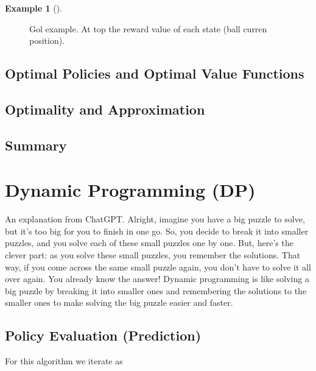 \documentclass[
  letterpaper,
]{krantz}
\theoremstyle{plain}
\theoremstyle{definition}
\newtheorem{example}{Example}[chapter]
\theoremstyle{definition}
\theoremstyle{remark}
\begin{document}
\begin{example}[]
\begin{figure}
\caption{\label{fig-golf-exm}Gol example. At top the reward value of
each state (ball curren position).}

\end{figure}%

\section{Optimal Policies and Optimal Value
Functions}\label{optimal-policies-and-optimal-value-functions}

\section{Optimality and
Approximation}\label{optimality-and-approximation}

\section{Summary}\label{summary-2}

\end{example}


\chapter{Dynamic Programming (DP)}\label{dynamic-programming-dp}

An explanation from ChatGPT. Alright, imagine you have a big puzzle to
solve, but it's too big for you to finish in one go. So, you decide to
break it into smaller puzzles, and you solve each of these small puzzles
one by one. But, here's the clever part: as you solve these small
puzzles, you remember the solutions. That way, if you come across the
same small puzzle again, you don't have to solve it all over again. You
already know the answer! Dynamic programming is like solving a big
puzzle by breaking it into smaller ones and remembering the solutions to
the smaller ones to make solving the big puzzle easier and faster.

\section{Policy Evaluation
(Prediction)}\label{policy-evaluation-prediction}

For this algorithm we iterate as
\end{document}
